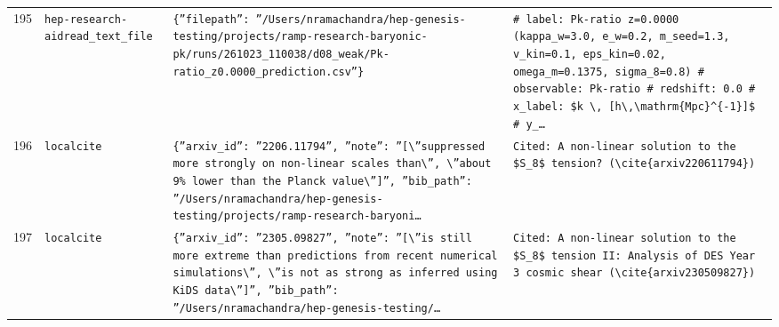\documentclass[11pt,a4paper]{article}
\begin{document}
\begin{longtable}{@{}p{}p{}p{}p{}@{}}
195 & \texttt{hep-research-aid}\newline\texttt{read\_\allowbreak{}text\_\allowbreak{}file} & \texttt{\{''filepath'':\allowbreak{} ''/\allowbreak{}Users/\allowbreak{}nramachandra/\allowbreak{}hep-genesis-testing/\allowbreak{}projects/\allowbreak{}ramp-research-baryonic-pk/\allowbreak{}runs/\allowbreak{}261023\_\allowbreak{}110038/\allowbreak{}d08\_\allowbreak{}weak/\allowbreak{}Pk-ratio\_\allowbreak{}z0.0000\_\allowbreak{}prediction.csv''\}\allowbreak{}} & \texttt{\# label:\allowbreak{} Pk-ratio z=\allowbreak{}0.0000 (kappa\_\allowbreak{}w=\allowbreak{}3.0,\allowbreak{} e\_\allowbreak{}w=\allowbreak{}0.2,\allowbreak{} m\_\allowbreak{}seed=\allowbreak{}1.3,\allowbreak{} v\_\allowbreak{}kin=\allowbreak{}0.1,\allowbreak{} eps\_\allowbreak{}kin=\allowbreak{}0.02,\allowbreak{} omega\_\allowbreak{}m=\allowbreak{}0.1375,\allowbreak{} sigma\_\allowbreak{}8=\allowbreak{}0.8)\allowbreak{} \# observable:\allowbreak{} Pk-ratio \# redshift:\allowbreak{} 0.0 \# x\_\allowbreak{}label:\allowbreak{} \$k \textbackslash{}\allowbreak{},\allowbreak{} [h\textbackslash{}\allowbreak{},\allowbreak{}\textbackslash{}\allowbreak{}mathrm\{Mpc\}\allowbreak{}\textasciicircum{}\allowbreak{}\{-1\}\allowbreak{}]\allowbreak{}\$ \# y\_\allowbreak{}\ldots{}\allowbreak{}} \\
196 & \texttt{local}\newline\texttt{cite} & \texttt{\{''arxiv\_\allowbreak{}id'':\allowbreak{} ''2206.11794'',\allowbreak{} ''note'':\allowbreak{} ''[\textbackslash{}\allowbreak{}''suppressed more strongly on non-linear scales than\textbackslash{}\allowbreak{}'',\allowbreak{} \textbackslash{}\allowbreak{}''about 9\% lower than the Planck value\textbackslash{}\allowbreak{}'']\allowbreak{}'',\allowbreak{} ''bib\_\allowbreak{}path'':\allowbreak{} ''/\allowbreak{}Users/\allowbreak{}nramachandra/\allowbreak{}hep-genesis-testing/\allowbreak{}projects/\allowbreak{}ramp-research-baryoni\ldots{}\allowbreak{}} & \texttt{Cited:\allowbreak{} A non-linear solution to the \$S\_\allowbreak{}8\$ tension? (\textbackslash{}\allowbreak{}cite\{arxiv220611794\}\allowbreak{})\allowbreak{}} \\
197 & \texttt{local}\newline\texttt{cite} & \texttt{\{''arxiv\_\allowbreak{}id'':\allowbreak{} ''2305.09827'',\allowbreak{} ''note'':\allowbreak{} ''[\textbackslash{}\allowbreak{}''is still more extreme than predictions from recent numerical simulations\textbackslash{}\allowbreak{}'',\allowbreak{} \textbackslash{}\allowbreak{}''is not as strong as inferred using KiDS data\textbackslash{}\allowbreak{}'']\allowbreak{}'',\allowbreak{} ''bib\_\allowbreak{}path'':\allowbreak{} ''/\allowbreak{}Users/\allowbreak{}nramachandra/\allowbreak{}hep-genesis-testing/\allowbreak{}\ldots{}\allowbreak{}} & \texttt{Cited:\allowbreak{} A non-linear solution to the \$S\_\allowbreak{}8\$ tension II:\allowbreak{} Analysis of DES Year 3 cosmic shear (\textbackslash{}\allowbreak{}cite\{arxiv230509827\}\allowbreak{})\allowbreak{}} \\

\end{longtable}
\end{document}
